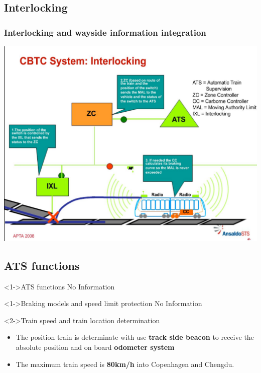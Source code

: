 \subsection{Interlocking}
\frame
{
\frametitle{Interlocking and wayside information integration}



 \begin{center}
	\includegraphics[scale=0.20]{./fig/AnsaldoInterloking}
      \end{center} 


  }


\subsection{ATS functions}
\frame
{

  
\begin{block}<1->{ATS functions}
No Information
\end{block}
   \begin{block}<1->{Braking models and speed limit protection}
No Information

   \end{block}
   
      \begin{block}<2->{Train speed and train location determination}
      \begin{itemize}
      \item The position train is determinate with use \textbf{track side beacon} to receive the absolute position and on board \textbf{odometer system} 
      \item The maximum train speed is \textbf{80km/h} into Copenhagen and Chengdu.
\end{itemize}
  \end{block}
}



